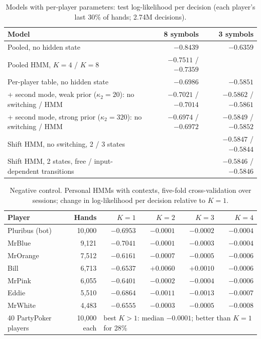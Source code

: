 \documentclass{article}
\newcommand{\shiftrows}{Shift HMM, no switching, 2 / 3 states & & $-0.5847$ / $-0.5844$\\
Shift HMM, 2 states, free / input-dependent transitions & & $-0.5846$ / $-0.5846$\\}
\begin{document}
\begin{table}[h]
\caption{Models with per-player parameters: test log-likelihood per decision (each player's last 30\% of hands; 2.74M decisions).}
\label{tab:personal}
\centering\small\setlength{\tabcolsep}{3.5pt}
\begin{tabular}{lrr}
\toprule
Model & 8 symbols & 3 symbols\\
\midrule
Pooled, no hidden state & $-0.8439$ & $-0.6359$\\
Pooled HMM, $K=4$ / $K=8$ & $-0.7511$ / $-0.7359$ & \\
Per-player table, no hidden state & $-0.6986$ & $-0.5851$\\
\quad + second mode, weak prior ($\kappa_2=20$): no switching / HMM & $-0.7021$ / $-0.7014$ & $-0.5862$ / $-0.5861$\\
\quad + second mode, strong prior ($\kappa_2=320$): no switching / HMM & $-0.6974$ / $-0.6972$ & $-0.5849$ / $-0.5852$\\
\shiftrows
\bottomrule
\end{tabular}
\end{table}

\begin{table}[h]
\caption{Negative control. Personal HMMs with contexts, five-fold cross-validation over sessions; change in log-likelihood per decision relative to $K=1$.}
\label{tab:pluribus}
\centering\small
\begin{tabular}{lrrrrr}
\toprule
Player & Hands & $K=1$ & $K=2$ & $K=3$ & $K=4$\\
\midrule
Pluribus (bot) & 10{,}000 & $-0.6953$ & $-0.0001$ & $-0.0002$ & $-0.0004$\\
MrBlue & 9{,}121 & $-0.7041$ & $-0.0001$ & $-0.0003$ & $-0.0004$\\
MrOrange & 7{,}512 & $-0.6161$ & $-0.0007$ & $-0.0005$ & $-0.0006$\\
Bill & 6{,}713 & $-0.6537$ & $+0.0060$ & $+0.0010$ & $-0.0006$\\
MrPink & 6{,}055 & $-0.6401$ & $-0.0002$ & $-0.0004$ & $-0.0006$\\
Eddie & 5{,}510 & $-0.6864$ & $-0.0011$ & $-0.0013$ & $-0.0007$\\
MrWhite & 4{,}483 & $-0.6555$ & $-0.0003$ & $-0.0005$ & $-0.0008$\\
\midrule
40 PartyPoker players & 10{,}000 each & \multicolumn{4}{l}{best $K>1$: median $-0.0001$; better than $K=1$ for 28\%}\\
\bottomrule
\end{tabular}
\end{table}
\end{document}
